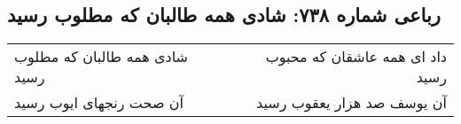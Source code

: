 \begin{center}
\section*{رباعی شماره ۷۳۸: شادی همه طالبان که مطلوب رسید}
\label{sec:0738}
\begin{longtable}{l p{0.5cm} r}
شادی همه طالبان که مطلوب رسید
&&
داد ای همه عاشقان که محبوب رسید
\\
آن صحت رنجهای ایوب رسید
&&
آن یوسف صد هزار یعقوب رسید
\\
\end{longtable}
\end{center}
